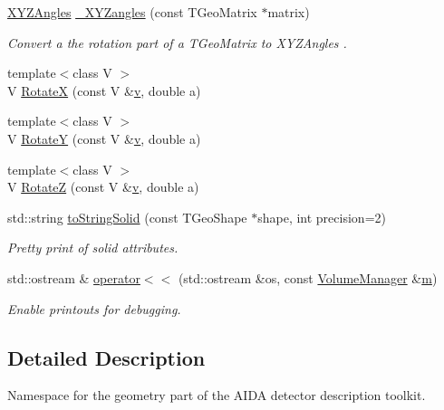 \begin{DoxyCompactItemize}
\hyperlink{namespace_d_d4hep_1_1_geometry_ab195c63789d4928d291d3b5522151aaa}{X\+Y\+Z\+Angles} \hyperlink{group___d_d4_h_e_p___g_e_o_m_e_t_r_y_gaf4d63a5a06b85c2a65143cc5f15a81fe}{\+\_\+\+X\+Y\+Zangles} (const T\+Geo\+Matrix $\ast$matrix)
\begin{DoxyCompactList}\small\item\em Convert a the rotation part of a T\+Geo\+Matrix to X\+Y\+Z\+Angles . \end{DoxyCompactList}\item 
{\footnotesize template$<$class V $>$ }\\V \hyperlink{namespace_d_d4hep_1_1_geometry_a4acfd853c88ea713e8ae04ad1967f59c}{RotateX} (const V \&\hyperlink{_multi_view_8cpp_a8320ee13ac034dbf6d624fe8953dd337}{v}, double a)
\item 
{\footnotesize template$<$class V $>$ }\\V \hyperlink{namespace_d_d4hep_1_1_geometry_a1ce692042d64099c435f9e23feaa41c2}{RotateY} (const V \&\hyperlink{_multi_view_8cpp_a8320ee13ac034dbf6d624fe8953dd337}{v}, double a)
\item 
{\footnotesize template$<$class V $>$ }\\V \hyperlink{namespace_d_d4hep_1_1_geometry_ad8325da9f2bdcecf327bd8a3f3f2185a}{RotateZ} (const V \&\hyperlink{_multi_view_8cpp_a8320ee13ac034dbf6d624fe8953dd337}{v}, double a)
\item 
std\+::string \hyperlink{namespace_d_d4hep_1_1_geometry_abd683b63937908cc4e95e3db3d4879a0}{to\+String\+Solid} (const T\+Geo\+Shape $\ast$shape, int precision=2)
\begin{DoxyCompactList}\small\item\em Pretty print of solid attributes. \end{DoxyCompactList}\item 
std\+::ostream \& \hyperlink{namespace_d_d4hep_1_1_geometry_a3e162786678e79867327c71e9699ac71}{operator$<$$<$} (std\+::ostream \&os, const \hyperlink{class_d_d4hep_1_1_geometry_1_1_volume_manager}{Volume\+Manager} \&\hyperlink{_volumes_8cpp_a6fc379aaec47ce424b00d8ffda2a6c59}{m})
\begin{DoxyCompactList}\small\item\em Enable printouts for debugging. \end{DoxyCompactList}\end{DoxyCompactItemize}


\subsection{Detailed Description}
Namespace for the geometry part of the A\+I\+DA detector description toolkit. 

